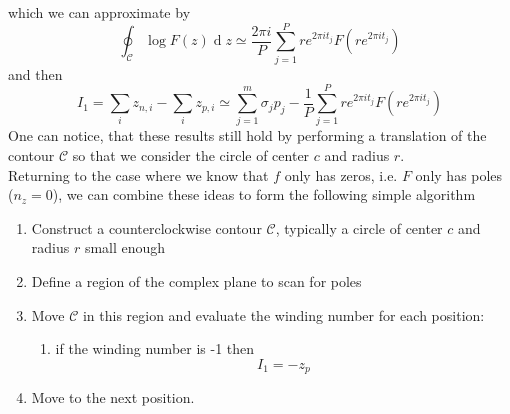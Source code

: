 \documentclass[11pt]{report}
\numberwithin{equation}{section}
\begin{document}
%
which we can approximate by
%
\begin{equation}
	\oint_\mathcal{C} \log F(z) \operatorname{d}z \simeq \frac{2 \pi i}{P} \sum_{j=1}^{P} re^{2 \pi i t_j} F(r e^{2 \pi i t_j})
\end{equation}
%
and then
%
\begin{equation}
	I_1 = \sum_i z_{n,i} - \sum_i z_{p,i} \simeq  \sum_{j=1}^m \sigma_j p_j  - \frac{1}{P} \sum_{j=1}^{P} re^{2 \pi i t_j} F(r e^{2 \pi i t_j}) 
\end{equation}
%
One can notice, that these results still hold by performing a translation of the contour $\mathcal{C}$ so that we consider the circle of center $c$ and radius $r$.\\
\noindent
Returning to the case where we know that $f$ only has zeros, i.e. $F$ only has poles ($n_z = 0$), we can combine these ideas to form the following simple algorithm
%
\begin{enumerate}
    \item Construct a counterclockwise contour $\mathcal{C}$, typically a circle of center $c$ and radius $r$ small enough
    \item Define a region of the complex plane to scan for poles
    \item Move  $\mathcal{C}$ in this region and evaluate the winding number for each position:
        \begin{enumerate}
        \item if the winding number is -1 then
            \begin{equation*}
                I_1 =  - z_p
            \end{equation*}
        \end{enumerate}
    \item Move to the next position.
\end{enumerate}
%
\end{document}
